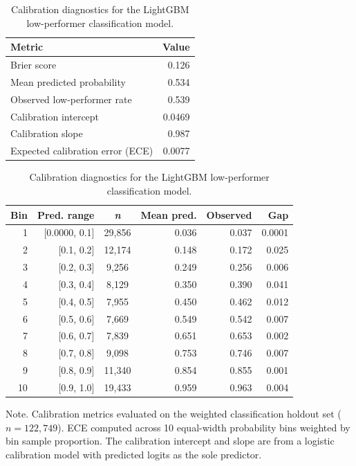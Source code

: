 \begin{table}[tb]
\centering
\caption{Calibration diagnostics for the LightGBM low-performer classification model.\label{tab:calibration}}
\begin{tabular}{@{}lr@{}}
\toprule
\textbf{Metric} & \textbf{Value} \\
\midrule
  Brier score & 0.126 \\
  Mean predicted probability & 0.534 \\
  Observed low-performer rate & 0.539 \\
  Calibration intercept & 0.0469 \\
  Calibration slope & 0.987 \\
  Expected calibration error (ECE) & 0.0077 \\
\bottomrule
\end{tabular}

\vspace{6pt}

\begin{tabular}{@{}rrcrrr@{}}
\toprule
\textbf{Bin} & \textbf{Pred. range} & \textbf{\textit{n}} & \textbf{Mean pred.} & \textbf{Observed} & \textbf{Gap} \\
\midrule
  1 & [0.0000, 0.1] & 29,856 & 0.036 & 0.037 & 0.0001 \\
  2 & [0.1, 0.2] & 12,174 & 0.148 & 0.172 & 0.025 \\
  3 & [0.2, 0.3] & 9,256 & 0.249 & 0.256 & 0.006 \\
  4 & [0.3, 0.4] & 8,129 & 0.350 & 0.390 & 0.041 \\
  5 & [0.4, 0.5] & 7,955 & 0.450 & 0.462 & 0.012 \\
  6 & [0.5, 0.6] & 7,669 & 0.549 & 0.542 & 0.007 \\
  7 & [0.6, 0.7] & 7,839 & 0.651 & 0.653 & 0.002 \\
  8 & [0.7, 0.8] & 9,098 & 0.753 & 0.746 & 0.007 \\
  9 & [0.8, 0.9] & 11,340 & 0.854 & 0.855 & 0.001 \\
  10 & [0.9, 1.0] & 19,433 & 0.959 & 0.963 & 0.004 \\
\bottomrule
\end{tabular}
\begin{tablenotes}
\item Note. Calibration metrics evaluated on the weighted classification holdout set ($n = 122{,}749$). ECE computed across 10 equal-width probability bins weighted by bin sample proportion. The calibration intercept and slope are from a logistic calibration model with predicted logits as the sole predictor.
\end{tablenotes}
\end{table}

